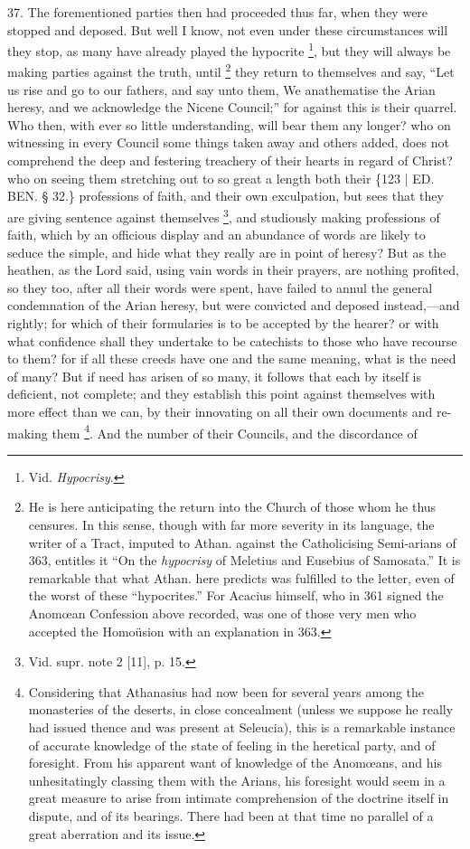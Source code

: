 37. The forementioned parties
then had proceeded thus far, when they were stopped and deposed. But
well I know, not even under these circumstances will they stop, as
many have already played the hypocrite \footnote{Vid. \emph{Hypocrisy}.}, but they will always be making parties against the truth,
until \footnote{He is here anticipating the return into the Church of those whom he
thus censures. In this sense, though with far more severity in its
language, the writer of a Tract, imputed to Athan. against the
Catholicising Semi-arians of 363, entitles it ``On the \emph{hypocrisy}
of Meletius and Eusebius of Samosata.'' It is remarkable that what
Athan. here predicts was fulfilled to the letter, even of the worst of
these ``hypocrites.'' For Acacius himself, who in 361 signed the Anomœan
Confession above recorded, was one of those very men who accepted the
Homoüsion with an explanation in 363.} they return to
themselves and say, ``Let us rise and go to our fathers, and say unto
them, We anathematise the Arian heresy, and we acknowledge the Nicene
Council;'' for against this is their quarrel. Who then, with ever so
little understanding, will bear them any longer? who on witnessing in
every Council some things taken away and others added, does not
comprehend the deep and festering treachery of their hearts in regard
of Christ? who on seeing them stretching out to so great a length both
their \{123 | ED.
BEN. § 32.\} professions of faith, and their
own exculpation, but sees that they are giving sentence against
themselves \footnote{Vid. supr. note 2 [11], p. 15.}, and
studiously making professions of faith, which by an officious display
and an abundance of words are likely to seduce the simple, and hide
what they really are in point of heresy? But as the heathen, as the
Lord said, using vain words in their prayers, are nothing profited, so
they too, after all their words were spent, have failed to annul the
general condemnation of the Arian heresy, but were convicted and
deposed instead,—and rightly; for which of their formularies is to
be accepted by the hearer? or with what confidence shall they
undertake to be catechists to those who have recourse to them? for if
all these creeds have one and the same meaning, what is the need of
many? But if need has arisen of so many, it follows that each by
itself is deficient, not complete; and they establish this point
against themselves with more effect than we can, by their innovating
on all their own documents and re-making them \footnote{Considering that Athanasius had now been for several years among the
monasteries of the deserts, in close concealment (unless we suppose he
really had issued thence and was present at Seleucia), this is a
remarkable instance of accurate knowledge of the state of feeling in
the heretical party, and of foresight. From his apparent want of
knowledge of the Anomœans, and his unhesitatingly classing them with
the Arians, his foresight would seem in a great measure to arise from
intimate comprehension of the doctrine itself in dispute, and of its
bearings. There had been at that time no parallel of a great
aberration and its issue.}. And the number of their Councils, and the discordance of

